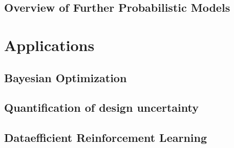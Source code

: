 \documentclass[letterpaper,10pt,english]{jupyterBook}
\begin{document}
\chapter{Overview of Further Probabilistic Models}
\label{\detokenize{probML/overview:overview-of-further-probabilistic-models}}\label{\detokenize{probML/overview::doc}}

\part{Applications}


\chapter{Bayesian Optimization}
\label{\detokenize{appl/BO:bayesian-optimization}}\label{\detokenize{appl/BO::doc}}

\chapter{Quantification of design uncertainty}
\label{\detokenize{appl/uncertainty:quantification-of-design-uncertainty}}\label{\detokenize{appl/uncertainty::doc}}

\chapter{Data\sphinxhyphen{}efficient Reinforcement Learning}
\label{\detokenize{appl/RL:data-efficient-reinforcement-learning}}\label{\detokenize{appl/RL::doc}}






\renewcommand{\indexname}{Index}
\printindex
\end{document}

